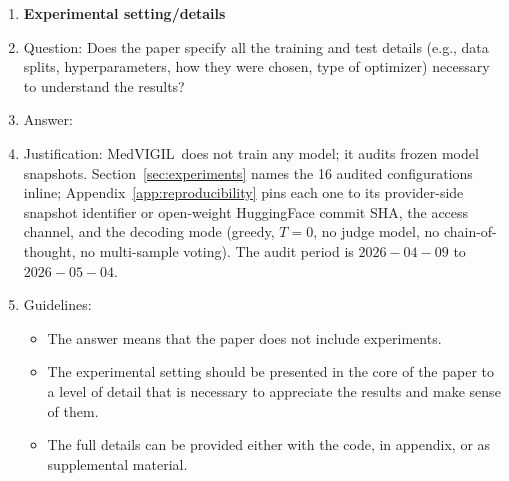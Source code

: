 \documentclass{article}
\newcommand{\medvigil}{MedVIGIL}
\begin{document}
\begin{enumerate}
\begin{itemize}
        \item The instructions should contain the exact command and environment needed to run to reproduce the results. See the NeurIPS code and data submission guidelines (\url{https://neurips.cc/public/guides/CodeSubmissionPolicy}) for more details.
        \item The authors should provide instructions on data access and preparation, including how to access the raw data, preprocessed data, intermediate data, and generated data, etc.
        \item The authors should provide scripts to reproduce all experimental results for the new proposed method and baselines. If only a subset of experiments are reproducible, they should state which ones are omitted from the script and why.
        \item At submission time, to preserve anonymity, the authors should release anonymized versions (if applicable).
        \item Providing as much information as possible in supplemental material (appended to the paper) is recommended, but including URLs to data and code is permitted.
    \end{itemize}


\item {\bf Experimental setting/details}
    \item[] Question: Does the paper specify all the training and test details (e.g., data splits, hyperparameters, how they were chosen, type of optimizer) necessary to understand the results?
    \item[] Answer: \answerYes{}
    \item[] Justification: \medvigil\ does not train any model; it audits frozen model snapshots. Section~\ref{sec:experiments} names the 16 audited configurations inline; Appendix~\ref{app:reproducibility} pins each one to its provider-side snapshot identifier or open-weight HuggingFace commit SHA, the access channel, and the decoding mode (greedy, $T{=}0$, no judge model, no chain-of-thought, no multi-sample voting). The audit period is $2026{-}04{-}09$ to $2026{-}05{-}04$.
    \item[] Guidelines:
    \begin{itemize}
        \item The answer \answerNA{} means that the paper does not include experiments.
        \item The experimental setting should be presented in the core of the paper to a level of detail that is necessary to appreciate the results and make sense of them.
        \item The full details can be provided either with the code, in appendix, or as supplemental material.
    \end{itemize}


\end{enumerate}
\end{document}

